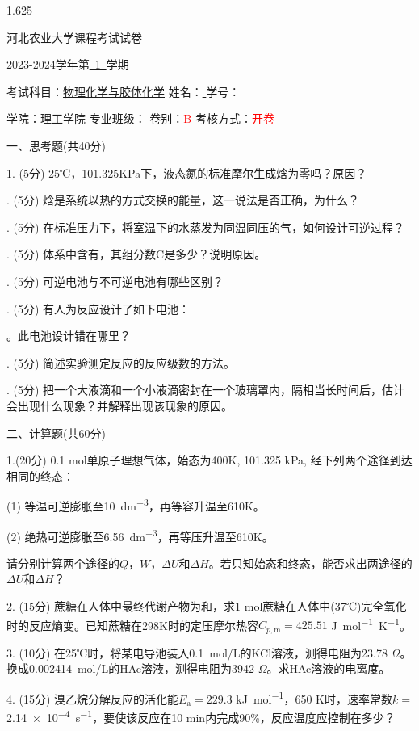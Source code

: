 \documentclass[12pt, b5paper]{article}
\newcommand*{\cred}{\textcolor{red}}
\begin{document}
\begin{spacing}{1.625}

\centerline{{\huge 河北农业大学课程考试试卷}}

\centerline{\large 2023-2024学年第\underline{\ 1\ }学期}

考试科目：\underline{物理化学与胶体化学} \quad 姓名：\underline{ \qquad \qquad} \quad 学号：\underline{ \qquad \qquad \qquad}

学院：\underline{理工学院} \quad 专业班级：\underline{\qquad \qquad \qquad \qquad} \quad 卷别：\cred{B} 考核方式：\cred{开卷}

\bigskip


一、思考题(共40分)

1. (5分) 25℃，101.325KPa下，液态氮的标准摩尔生成焓为零吗？原因？

. (5分) 焓是系统以热的方式交换的能量，这一说法是否正确，为什么？

. (5分) 在标准压力下，将室温下的水蒸发为同温同压的气，如何设计可逆过程？

. (5分) 体系中含有，其组分数C是多少？说明原因。

. (5分) 可逆电池与不可逆电池有哪些区别？

. (5分) 有人为反应设计了如下电池：

。此电池设计错在哪里？

. (5分) 简述实验测定反应的反应级数的方法。

. (5分) 把一个大液滴和一个小液滴密封在一个玻璃罩内，隔相当长时间后，估计会出现什么现象？并解释出现该现象的原因。

\newpage
二、计算题(共60分)

1.(20分) 0.1 mol单原子理想气体，始态为400K, 101.325 kPa, 经下列两个途径到达相同的终态：

(1) 等温可逆膨胀至\SI{10}{dm^{-3}}，再等容升温至610K。

(2) 绝热可逆膨胀至\SI{6.56}{dm^{-3}}，再等压升温至610K。

请分别计算两个途径的$Q$，$W$，$\Delta U$和$\Delta H$。若只知始态和终态，能否求出两途径的$\Delta U$和$\Delta H$？

\vspace{4em}
2. (15分) 
蔗糖在人体中最终代谢产物为和，求1 mol蔗糖在人体中(37℃)完全氧化时的反应熵变。已知蔗糖在298K时的定压摩尔热容$C_{p,\mathrm{m}}=425.51$ \si{J.mol^{-1}.K^{-1}}。

\vspace{4em}
3. (10分)
在25℃时，将某电导池装入\SI{0.1}{mol/L}的KCl溶液，测得电阻为23.78 $\Omega$。换成\SI{0.002414}{mol/L}的HAc溶液，测得电阻为3942 $\Omega$。求HAc溶液的电离度。

\vspace{4em}
4. (15分)
溴乙烷分解反应的活化能$E_\mathrm{a}=229.3$ \si{kJ.mol^{-1}}，650 K时，速率常数$k=$\SI{2.14e-4}{s^{-1}}，要使该反应在10 min内完成90\%，反应温度应控制在多少？


\end{spacing}
\end{document}
